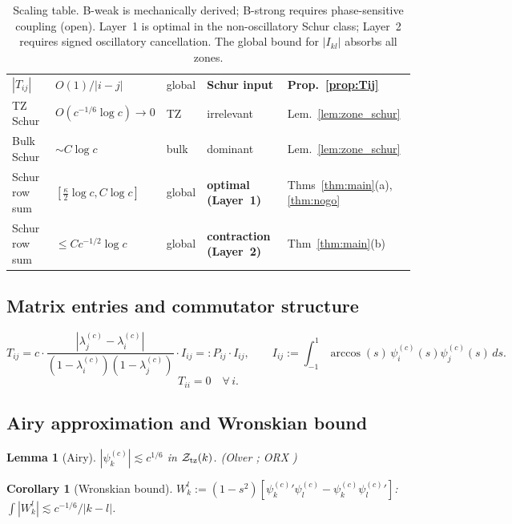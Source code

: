 \documentclass[12pt,a4paper]{article}
\newtheorem{lemma}[theorem]{Lemma}
\newtheorem{corollary}[theorem]{Corollary}
\newcommand{\pswf}[1]{\psi_{#1}^{(c)}}
\newcommand{\lam}[1]{\lambda_{#1}^{(c)}}
\begin{document}
\begin{table}[h]
\begin{tabular}{lllll}
$|T_{ij}|$&$O(1)/|i-j|$&global&\textbf{Schur input}
  &\textbf{Prop.~\ref{prop:Tij}}\\
TZ Schur&$O(c^{-1/6}\log c)\to0$&TZ&irrelevant
  &Lem.~\ref{lem:zone_schur}\\
Bulk Schur&$\sim C\log c$&bulk&dominant
  &Lem.~\ref{lem:zone_schur}\\
Schur row sum&$[\tfrac{\kappa}{2}\log c,C\log c]$&global
  &\textbf{optimal (Layer~1)}&Thms~\ref{thm:main}(a),\ref{thm:nogo}\\
Schur row sum&$\leq Cc^{-1/2}\log c$&global
  &\textbf{contraction (Layer~2)}&Thm~\ref{thm:main}(b)\\
\hline
\end{tabular}
\caption{Scaling table. B-weak is mechanically derived;
B-strong requires phase-sensitive coupling (open).
Layer~1 is optimal in the non-oscillatory Schur class;
Layer~2 requires signed oscillatory cancellation.
The global bound for $|I_{kl}|$ absorbs all zones.}
\label{tab:scales}
\end{table}

\subsection{Matrix entries and commutator structure}

\begin{equation}\label{eq:Tij_simple}
  T_{ij} = c\cdot
  \frac{|\lam{j}-\lam{i}|}{(1-\lam{i})(1-\lam{j})}
  \cdot I_{ij} =: P_{ij}\cdot I_{ij},\qquad
  I_{ij}:=\int_{-1}^1\arccos(s)\,\pswf{i}(s)\pswf{j}(s)\,ds.
\end{equation}
\begin{equation}\label{eq:diagzero}
  T_{ii}=0\quad\forall\,i.
\end{equation}

\subsection{Airy approximation and Wronskian bound}

\begin{lemma}[Airy]\label{lem:Airy}
$|\pswf{k}|\lesssim c^{1/6}$ in $\mathcal{Z}_{\rm tz}(k)$.
\emph{(Olver \cite{Olver1974}; ORX \cite{OsipovRokhlinXiao2013})}
\end{lemma}

\begin{corollary}[Wronskian bound]\label{cor:Wronskian}
$W_k^l:=(1-s^2)[\pswf{k}'\pswf{l}-\pswf{k}\pswf{l}']$:
$\int|W_k^l|\lesssim c^{-1/6}/|k-l|$.
\end{corollary}
\end{document}
